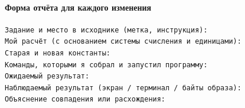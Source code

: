 \hypertarget{ux444ux43eux440ux43cux430-ux43eux442ux447ux451ux442ux430-ux434ux43bux44f-ux43aux430ux436ux434ux43eux433ux43e-ux438ux437ux43cux435ux43dux435ux43dux438ux44f}{%
\paragraph{Форма отчёта для каждого
изменения}\label{ux444ux43eux440ux43cux430-ux43eux442ux447ux451ux442ux430-ux434ux43bux44f-ux43aux430ux436ux434ux43eux433ux43e-ux438ux437ux43cux435ux43dux435ux43dux438ux44f}}

\begin{verbatim}
Задание и место в исходнике (метка, инструкция):
Мой расчёт (с основанием системы счисления и единицами):
Старая и новая константы:
Команды, которыми я собрал и запустил программу:
Ожидаемый результат:
Наблюдаемый результат (экран / терминал / байты образа):
Объяснение совпадения или расхождения:
\end{verbatim}
